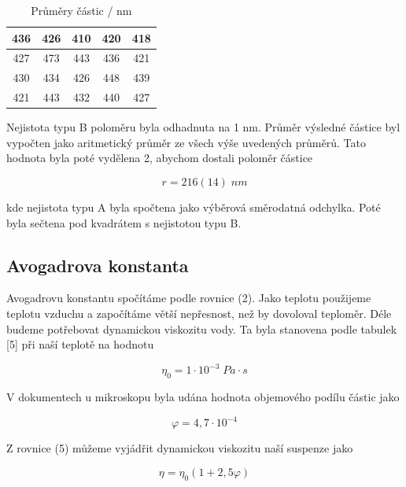 \begin{table}[h]
\centering
\begin{tabular}{|c|c|c|c|c|}
\hline
436 & 426 & 410 & 420 & 418 \\ \hline
427 & 473 & 443 & 436 & 421 \\ \hline
430 & 434 & 426 & 448 & 439 \\ \hline
421 & 443 & 432 & 440 & 427 \\ \hline
\end{tabular}
\caption{Průměry částic / nm}
\label{tab:polomery-castic}
\end{table}

Nejistota typu B poloměru byla odhadnuta na 1 nm. Průměr výsledné částice byl vypočten jako aritmetický průměr ze všech výše uvedených průměrů. Tato hodnota byla poté vydělena 2, abychom dostali poloměr částice

\begin{equation}
    \nonumber
    r = 216(14) \; nm
\end{equation}

kde nejistota typu A byla spočtena jako výběrová směrodatná odchylka. Poté byla sečtena pod kvadrátem s nejistotou typu B.

\subsection{Avogadrova konstanta}

Avogadrovu konstantu spočítáme podle rovnice (2). Jako teplotu použijeme teplotu vzduchu a započítáme větší nepřesnost, než by dovoloval teploměr. Déle budeme potřebovat dynamickou viskozitu vody. Ta byla stanovena podle tabulek [5] při naší teplotě na hodnotu

\begin{equation}
    \nonumber
    \eta_0 = 1 \cdot 10^{-3} \; Pa \cdot s
\end{equation}

V dokumentech u mikroskopu byla udána hodnota objemového podílu částic jako

\begin{equation}
    \nonumber
    \varphi = 4,7 \cdot 10^{-4}
\end{equation}

Z rovnice (5) můžeme vyjádřit dynamickou viskozitu naší suspenze jako

\begin{equation}
    \eta = \eta_0 (1 + 2,5 \varphi)
\end{equation}

